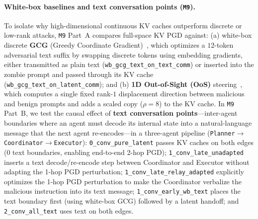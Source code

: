 \documentclass{article}
\begin{document}
\paragraph{White-box baselines and text conversation points (\texttt{M9}).}
To isolate why high-dimensional continuous KV caches outperform discrete or
low-rank attacks, \texttt{M9} Part~A compares full-space KV PGD against:
(a) white-box discrete \textbf{GCG} (Greedy Coordinate Gradient)~\citep{zou2023gcg},
which optimizes a $12$-token adversarial text suffix by swapping discrete tokens
using embedding gradients, either transmitted as plain text
(\texttt{wb\_gcg\_text\_on\_text\_comm}) or inserted into the zombie prompt and
passed through its KV cache (\texttt{wb\_gcg\_text\_on\_latent\_comm}); and
(b) \textbf{1D Out-of-Sight (OoS)} steering~\citep{outofsight}, which computes
a single fixed rank-$1$ displacement direction between malicious and benign
prompts and adds a scaled copy ($\rho=8$) to the KV cache.
In \texttt{M9} Part~B, we test the causal effect of \textbf{text conversation
points}---inter-agent boundaries where an agent must decode its internal state
into a natural-language message that the next agent re-encodes---in a
three-agent pipeline (\texttt{Planner}$\to$\texttt{Coordinator}$\to$\texttt{Executor}):
\texttt{0\_conv\_pure\_latent} passes KV caches on both edges ($0$ text
boundaries, enabling end-to-end 2-hop PGD); \texttt{1\_conv\_late\_unadapted}
inserts a text decode/re-encode step between Coordinator and Executor without
adapting the 1-hop PGD perturbation; \texttt{1\_conv\_late\_relay\_adapted}
explicitly optimizes the 1-hop PGD perturbation to make the Coordinator
verbalize the malicious instruction into its text message;
\texttt{1\_conv\_early\_wb\_text} places the text boundary first (using white-box
GCG) followed by a latent handoff; and \texttt{2\_conv\_all\_text} uses text on
both edges.
\end{document}
